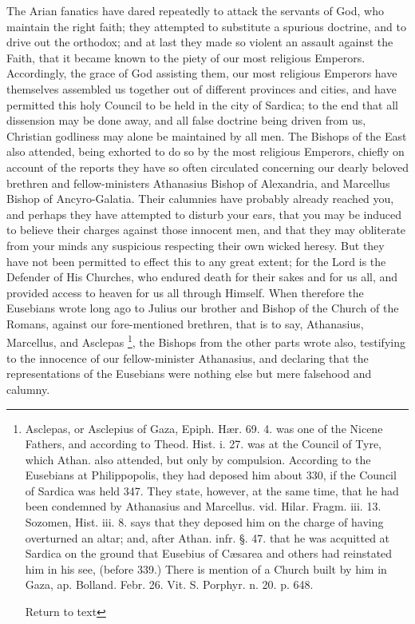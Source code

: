 The Arian fanatics have dared repeatedly to
attack the servants of God, who maintain the right faith; they
attempted to substitute a spurious doctrine, and to drive out the
orthodox; and at last they made so violent an assault against the
Faith, that it became known to the piety of our most religious
Emperors. Accordingly, the grace of God assisting them, our most
religious Emperors have themselves assembled us together out of
different provinces and cities, and have permitted this holy Council
to be held in the city of Sardica; to the end that all dissension may
be done away, and all false doctrine being driven from us, Christian
godliness may alone be maintained by all men. The Bishops of the East
also attended, being exhorted to do so by the most religious Emperors,
chiefly on account of the reports they have so often circulated
concerning our dearly beloved brethren and fellow-ministers Athanasius
Bishop of Alexandria, and Marcellus Bishop of Ancyro-Galatia. Their
calumnies have probably already reached you, and perhaps they have
attempted to disturb your ears, that you may be induced to believe
their charges against those innocent men, and that they may obliterate
from your minds any suspicious respecting their own wicked heresy. But
they have not been permitted to effect this to any great extent; for
the Lord is the Defender of His Churches, who endured death for their
sakes and for us all, and provided access to heaven for us all through
Himself. When therefore the Eusebians wrote long ago to Julius our
brother and Bishop of the Church of the Romans, against our
fore-mentioned brethren, that is to say, Athanasius, Marcellus, and
Asclepas \footnote{Asclepas, or Asclepius of Gaza, Epiph. Hær.
69. 4. was one of the Nicene Fathers, and according to Theod. Hist. i.
27. was at the Council of Tyre, which Athan. also attended, but only
by compulsion. According to the Eusebians at Philippopolis, they had
deposed him about 330, if the Council of Sardica was held 347. They
state, however, at the same time, that he had been condemned by
Athanasius and Marcellus. vid. Hilar. Fragm. iii. 13. Sozomen, Hist.
iii. 8. says that they deposed him on the charge of having overturned
an altar; and, after Athan. infr. §. 47. that he was acquitted at
Sardica on the ground that Eusebius of Cæsarea and others had
reinstated him in his see, (before 339.) There is mention of a Church
built by him in Gaza, ap. Bolland. Febr. 26. Vit. S. Porphyr. n. 20.
p. 648.

Return to text}, the Bishops from the other parts wrote also,
testifying to the innocence of our fellow-minister Athanasius, and
declaring that the representations of the Eusebians were nothing else
but mere falsehood and calumny.

